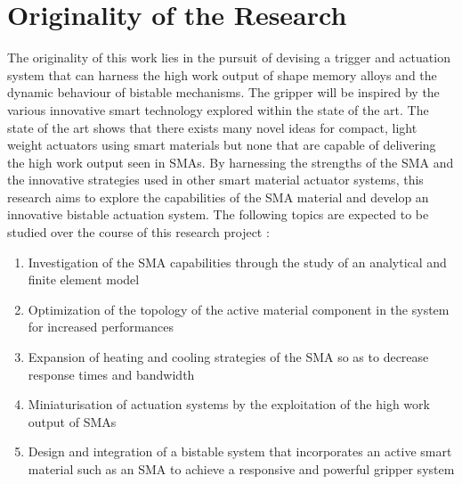 \section{Originality of the Research} \label{sec:originality}
The originality of this work lies in the pursuit of devising a trigger and actuation system that can harness the high work output of shape memory alloys and the dynamic behaviour of bistable mechanisms. The gripper will be inspired by the various innovative smart technology explored within the state of the art. The state of the art shows that there exists many novel ideas for compact, light weight actuators using smart materials but none that are capable of delivering the high work output seen in SMAs. By harnessing the strengths of the SMA and the innovative strategies used in other smart material actuator systems, this research aims to explore the capabilities of the SMA material and develop an innovative bistable actuation system. The following topics are expected to be studied over the course of this research project :
\begin{enumerate}
  \item Investigation of the SMA capabilities through the study of an analytical and finite element model
  \item Optimization of the topology of the active material component in the system for increased performances
  \item Expansion of heating and cooling strategies of the SMA so as to decrease response times and bandwidth
  \item Miniaturisation of actuation systems by the exploitation of the high work output of SMAs
  \item Design and integration of a bistable system that incorporates an active smart material such as an SMA to achieve a responsive and powerful gripper system
\end{enumerate}
